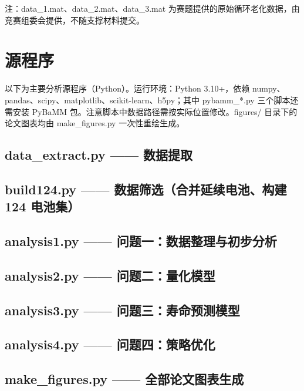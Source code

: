 \documentclass[withoutpreface]{cumcmthesis}
\begin{document}
\begin{appendices}
\noindent 注：data\_1.mat、data\_2.mat、data\_3.mat 为赛题提供的原始循环老化数据，由竞赛组委会提供，不随支撑材料提交。

\section{源程序}

以下为主要分析源程序（Python）。运行环境：Python 3.10+，依赖 numpy、pandas、scipy、matplotlib、scikit-learn、h5py；其中 pybamm\_*.py 三个脚本还需安装 PyBaMM 包。注意脚本中数据路径需按实际位置修改。figures/ 目录下的论文图表均由 make\_figures.py 一次性重绘生成。

\subsection{data\_extract.py —— 数据提取}


\subsection{build124.py —— 数据筛选（合并延续电池、构建 124 电池集）}


\subsection{analysis1.py —— 问题一：数据整理与初步分析}


\subsection{analysis2.py —— 问题二：量化模型}


\subsection{analysis3.py —— 问题三：寿命预测模型}


\subsection{analysis4.py —— 问题四：策略优化}


\subsection{make\_figures.py —— 全部论文图表生成}


\end{appendices}
\end{document}
